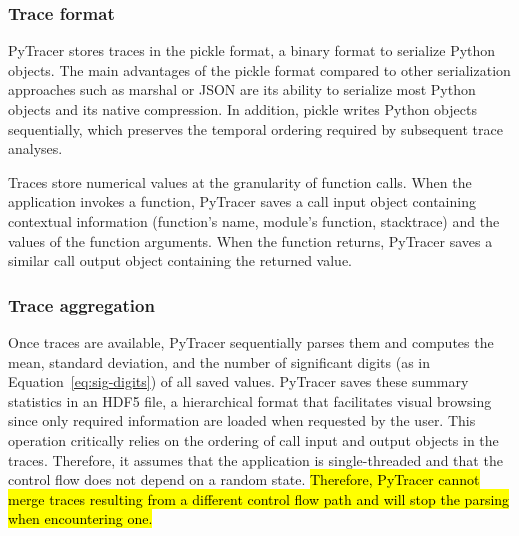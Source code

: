 \documentclass[10pt,journal,compsoc]{IEEEtran}
\newcommand{\pytracer}[0]{PyTracer\xspace}
\DeclareRobustCommand{\add}[1]{{\sethlcolor{lightgreen}\hl{#1}}}
\begin{document}
\subsubsection{Trace format}

\pytracer stores traces in the pickle format, a binary format to serialize
Python objects. The main advantages of the pickle format compared to other
serialization approaches such as marshal or JSON are its ability to serialize
most Python objects and its native compression.  In addition, pickle writes
Python objects sequentially, which preserves the temporal ordering required by
subsequent trace analyses.

Traces store numerical values at the granularity of function calls. When the
application invokes a function, \pytracer saves a call input object containing
contextual information (function's name, module's function, stacktrace) and the
values of the function arguments. When the function returns, \pytracer saves a
similar call output object containing the returned value. 


\subsubsection{Trace aggregation}

Once traces are available, \pytracer sequentially parses them and computes the
mean, standard deviation, and the number of significant digits (as in
Equation~\ref{eq:sig-digits}) of all saved values. \pytracer saves these summary
statistics in an HDF5 file, a hierarchical format that facilitates visual
browsing since only required information are loaded when requested by the user.
This operation critically relies on the ordering of call input and output
objects in the traces. Therefore, it assumes that the application is
single-threaded and that the control flow does not depend on a random state. 
\add{Therefore, \mbox{\pytracer} cannot merge traces resulting from a different control flow path
    and will stop the parsing when encountering one.}
\end{document}
